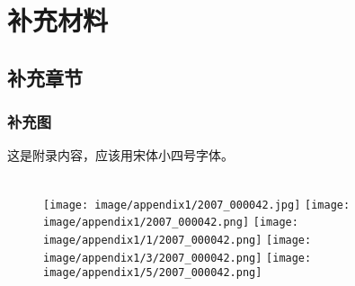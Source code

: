 
\chapter{补充材料}


\section{补充章节}

\subsection{补充图}

这是附录内容，应该用宋体小四号字体。

\begin{figure}[h!]
	\centering
	 \\
	\texttt{[image: image/appendix1/2007\_000042.jpg]}
	\texttt{[image: image/appendix1/2007\_000042.png]}
	\texttt{[image: image/appendix1/1/2007\_000042.png]}
	\texttt{[image: image/appendix1/3/2007\_000042.png]}
	\texttt{[image: image/appendix1/5/2007\_000042.png]} \\


\end{figure}
